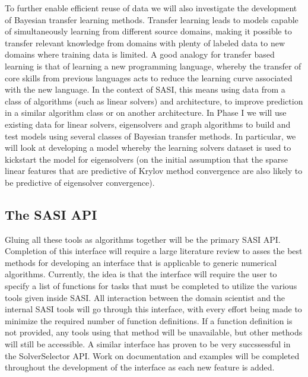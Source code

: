 To further enable efficient reuse of data we will also investigate the development of Bayesian transfer learning methods. Transfer learning leads to models capable of simultaneously learning from different source domains, making it possible to transfer relevant knowledge from domains with plenty of labeled data to new domains where training data is limited. A good analogy for transfer based learning is that of learning a new programming language, whereby the transfer of core skills from previous languages acts to reduce the learning curve associated with the new language. In the context of SASI, this means using data from a class of algorithms (such as linear solvers) and architecture,  to improve prediction in a similar algorithm class or on another architecture. In Phase I we will use existing data for linear solvers, eigensolvers and graph algorithms to build and test models using several classes of Bayesian transfer methods. In particular, we will look at developing a model whereby the learning solvers dataset is used to kickstart the model for eigensolvers (on the initial assumption that the sparse linear features that are predictive of Krylov method convergence are also likely to be predictive of eigensolver convergence).


\subsection{The SASI API} 
Gluing all these tools as algorithms together will be the primary SASI API. Completion of this interface will require a large literature review to asses the best methods for developing an interface that is applicable to generic numerical algorithms. Currently, the idea is that the interface will require the user to specify a list of functions for tasks that must be completed to utilize the various tools given inside SASI. All interaction between the domain scientist and the internal SASI tools will go through this interface, with every effort being made to minimize the required number of function definitions. If a function definition is not provided, any tools using that method will be unavailable, but other methods will still be accessible. A similar interface has proven to be very succssessful in the SolverSelector API. Work on documentation and examples will be completed throughout the development of the interface as each new feature is added. 
 
